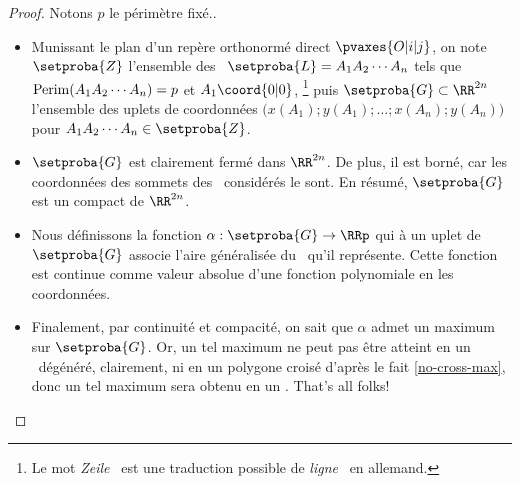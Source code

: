 \begin{proof}
	Notons $p$ le périmètre fixé..
    \begin{itemize}
        \item Munissant le plan d'un repère orthonormé direct $\pvaxes{O | i | j}$, on note $\setproba{Z}$ l'ensemble des \ncycles\ $\setproba{L} = A_1 A_2 \cdots A_n$ tels que
        $\mathrm{Perim}(A_1 A_2 \cdots A_n) = p$
        et
        $A_1\coord{0 | 0}$,%
        \footnote{
        	Le mot \og \emph{Zeile} \fg\ est une traduction possible de \og \emph{ligne} \fg\ en allemand.
        }
        puis $\setproba{G} \subset \RR^{2n}$ l'ensemble des uplets de coordonnées $\big( x(A_1) ; y(A_1) ; \dots ; x(A_n) ; y(A_n) \big)$ pour $A_1 A_2 \cdots A_n \in \setproba{Z}$.


        \item $\setproba{G}$ est clairement fermé dans $\RR^{2n}$.
        De plus, il est borné, car les coordonnées des sommets des \ncycles\ considérés le sont.
        En résumé, $\setproba{G}$ est un compact de $\RR^{2n}$.


        \item Nous définissons la fonction $\alpha: \setproba{G} \rightarrow \RRp$ qui à un uplet de $\setproba{G}$ associe l'aire généralisée du \ncycle\ qu'il représente.
        Cette fonction est continue comme valeur absolue d'une fonction polynomiale en les coordonnées.


        \item Finalement, par continuité et compacité, on sait que $\alpha$ admet un maximum sur $\setproba{G}$.
        Or, un tel maximum ne peut pas être atteint en un \ncycle\ dégénéré, clairement, ni en un polygone croisé d'après le fait \ref{no-cross-max}, donc un tel maximum sera obtenu en un \ngone. That's all folks!
    \end{itemize}
\end{proof}
